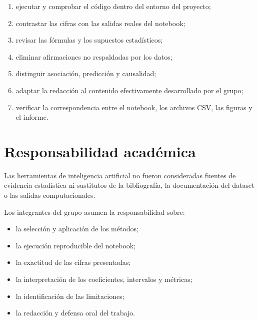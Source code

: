 \begin{enumerate}
    \item ejecutar y comprobar el código dentro del entorno del proyecto;

    \item contrastar las cifras con las salidas reales del notebook;

    \item revisar las fórmulas y los supuestos estadísticos;

    \item eliminar afirmaciones no respaldadas por los datos;

    \item distinguir asociación, predicción y causalidad;

    \item adaptar la redacción al contenido efectivamente desarrollado
    por el grupo;

    \item verificar la correspondencia entre el notebook, los archivos
    CSV, las figuras y el informe.
\end{enumerate}

\section*{Responsabilidad académica}

Las herramientas de inteligencia artificial no fueron consideradas
fuentes de evidencia estadística ni sustitutos de la bibliografía, la
documentación del dataset o las salidas computacionales.

Los integrantes del grupo asumen la responsabilidad sobre:

\begin{itemize}
    \item la selección y aplicación de los métodos;

    \item la ejecución reproducible del notebook;

    \item la exactitud de las cifras presentadas;

    \item la interpretación de los coeficientes, intervalos y métricas;

    \item la identificación de las limitaciones;

    \item la redacción y defensa oral del trabajo.
\end{itemize}

